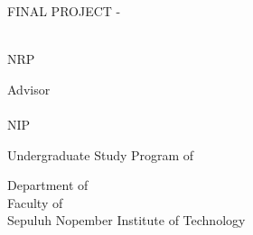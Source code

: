 \begin{large}
  FINAL PROJECT - \coursecode{}
\end{large}

\vspace{\fill}

\begin{spacing}{1.5}
  \begin{Large}
    \engtatitle{}
  \end{Large}
\end{spacing}

\vspace{\fill}

\begin{large}
  \name{} \\
  \textmd{NRP \nrp{}}
\end{large}

\vspace{\fill}

\begin{large}
  \textmd{Advisor} \\
  \advisor{} \\
  \textmd{NIP \advisornip{}} \\
\end{large}

\vspace{\fill}

Undergraduate Study Program of \engstudyprogram{} \\

\mdseries

Department of \engdepartment{} \\
Faculty of \engfaculty{} \\
Sepuluh Nopember Institute of Technology

\place{} \\ \the\year{}
